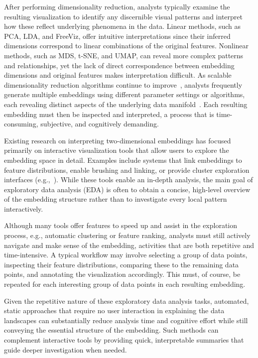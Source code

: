 \documentclass[lettersize,journal]{IEEEtran}
\begin{document}
After performing dimensionality reduction, analysts typically examine the resulting visualization to identify any discernible visual patterns and interpret how these reflect underlying phenomena in the data.
Linear methods, such as PCA, LDA, and FreeViz, offer intuitive interpretations since their inferred dimensions correspond to linear combinations of the original features. Nonlinear methods, such as MDS, t-SNE, and UMAP, can reveal more complex patterns and relationships, yet the lack of direct correspondence between embedding dimensions and original features makes interpretation difficult. As scalable dimensionality reduction algorithms continue to improve~\cite{McInnes2018,Linderman2019,Lambert2022}, analysts frequently generate multiple embeddings using different parameter settings or algorithms, each revealing distinct aspects of the underlying data manifold~\cite{Kobak2019}. Each resulting embedding must then be inspected and interpreted, a process that is time-consuming, subjective, and cognitively demanding.

Existing research on interpreting two-dimensional embeddings has focused primarily on interactive visualization tools that allow users to explore the embedding space in detail. Examples include systems that link embeddings to feature distributions, enable brushing and linking, or provide cluster exploration interfaces (e.g.,~\cite{Endert2014,Krause2014}).
While these tools enable an in-depth analysis, the main goal of exploratory data analysis (EDA) is often to obtain a concise, high-level overview of the embedding structure rather than to investigate every local pattern interactively.

Although many tools offer features to speed up and assist in the exploration process, e.g., automatic clustering or feature ranking, analysts must still actively navigate and make sense of the embedding, activities that are both repetitive and time-intensive.
A typical workflow may involve selecting a group of data points, inspecting their feature distributions, comparing these to the remaining data points, and annotating the visualization accordingly. This must, of course, be repeated for each interesting group of data points in each resulting embedding.

Given the repetitive nature of these exploratory data analysis tasks, automated, static approaches that require no user interaction in explaining the data landscapes can substantially reduce analysis time and cognitive effort while still conveying the essential structure of the embedding. Such methods can complement interactive tools by providing quick, interpretable summaries that guide deeper investigation when needed.
\end{document}
